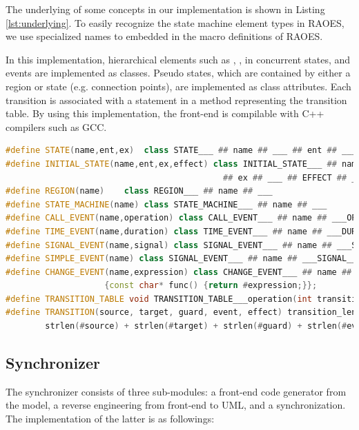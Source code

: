 The underlying of some concepts in our implementation is shown in Listing \ref{lst:underlying}.
To easily recognize the state machine element types in RAOES, we use specialized names to embedded in the macro definitions of RAOES. 

In this implementation, hierarchical elements such as , ,  in concurrent states, and events are implemented as classes.
Pseudo states, which are contained by either a region or state (e.g. connection points), are implemented as class attributes.
Each transition is associated with a statement in a method representing the transition table.
By using this implementation, the front-end is compilable with C++ compilers such as GCC.


\begin{lstlisting}[float=*,language=C++, caption=The underlying representation of the C++ front-end, label=lst:underlying]
#define STATE(name,ent,ex)	class STATE___ ## name ## ___ ## ent ## ___ ## ex ## ___
#define INITIAL_STATE(name,ent,ex,effect) class INITIAL_STATE___ ## name ## ___ ## ent ## ___ \
											## ex ## ___ ## EFFECT ## ___ ## effect
#define REGION(name)	class REGION___ ## name ## ___
#define STATE_MACHINE(name)	class STATE_MACHINE___ ## name ## ___
#define CALL_EVENT(name,operation) class CALL_EVENT___ ## name ## ___OPERATION___ ## operation {};
#define TIME_EVENT(name,duration) class TIME_EVENT___ ## name ## ___DURATION___ ## duration {};
#define SIGNAL_EVENT(name,signal) class SIGNAL_EVENT___ ## name ## ___SIGNAL___ ## signal {};
#define SIMPLE_EVENT(name) class SIGNAL_EVENT___ ## name ## ___SIGNAL___NULL{}; 
#define CHANGE_EVENT(name,expression) class CHANGE_EVENT___ ## name ## ___EXPRESSION___ \
					{const char* func() {return #expression;}};
#define TRANSITION_TABLE void TRANSITION_TABLE___operation(int transition_len)
#define TRANSITION(source, target, guard, event, effect) transition_len = strlen("transition") + \
		strlen(#source) + strlen(#target) + strlen(#guard) + strlen(#event) + strlen(#effect);
\end{lstlisting}


\subsection{Synchronizer}
The synchronizer consists of three sub-modules: a front-end code generator from the model, a reverse engineering from front-end to UML, and a synchronization.
The implementation of the latter is as followings:

